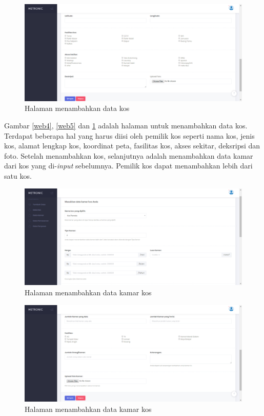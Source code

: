 \begin{enumerate}[a.]
		\begin{figure}[H]
			\centering
			\includegraphics[width=\textwidth]{gambar/web/6}
			\caption{Halaman menambahkan data kos}
			\label{web6}
		\end{figure}
			
		Gambar \ref{web4}, \ref{web5} dan \ref{web6} adalah halaman untuk menambahkan data kos. Terdapat beberapa hal yang harus diisi oleh pemilik kos seperti nama kos, jenis kos, alamat lengkap kos, koordinat peta, fasilitas kos, akses sekitar, deksripsi dan foto. Setelah menambahkan kos, selanjutnya adalah menambahkan data kamar dari kos yang di-\textit{input} sebelumnya. Pemilik kos dapat menambahkan lebih dari satu kos.
		
		\begin{figure}[H]
			\centering
			\includegraphics[width=\textwidth]{gambar/web/7}
			\caption{Halaman menambahkan data kamar kos}
			\label{web7}
		\end{figure}
	
		\begin{figure}[H]
			\centering
			\includegraphics[width=\textwidth]{gambar/web/8}
			\caption{Halaman menambahkan data kamar kos}
			\label{web8}
		\end{figure}
		

\end{enumerate}
